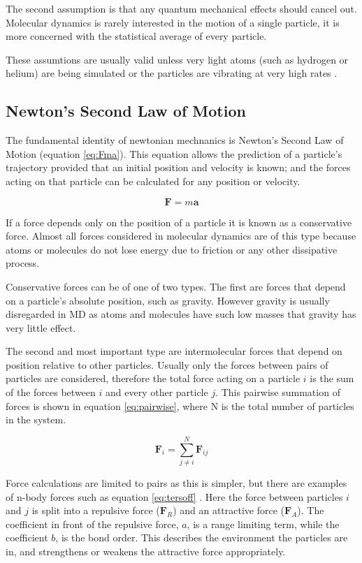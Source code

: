 \documentclass[12pt]{UoAthesis}
\begin{document}
The second assumption is that any quantum mechanical effects should
cancel out. Molecular dynamics is rarely interested in the motion of a
single particle, it is more concerned with the statistical average of
every particle.

These assumtions are usually valid unless very light atoms (such as
hydrogen or helium) are being simulated or the particles are vibrating
at very high rates \cite{Frenkel2002}.

\subsection{Newton's Second Law of Motion}

The fundamental identity of newtonian mechnanics is Newton's Second
Law of Motion (equation \eqref{eq:Fma}). This equation allows the prediction of a
particle's trajectory provided that an initial position and velocity
is known; and the forces acting on that particle can be calculated for
any position or velocity.

\begin{equation}
  \mathbf{F} = m\mathbf{a}
  \label{eq:Fma} 
\end{equation}

If a force depends only on the position of a particle it is known as a
conservative force. Almost all forces considered in molecular dynamics
are of this type because atoms or molecules do not lose energy due to
friction or any other dissipative process.

Conservative forces can be of one of two types.  The first are forces
that depend on a particle's absolute position, such as gravity.
However gravity is usually disregarded in MD as atoms and molecules
have such low masses that gravity has very little effect.

The second and most important type are intermolecular forces that
depend on position relative to other particles.  Usually only the
forces between pairs of particles are considered, therefore the total
force acting on a particle $i$ is the sum of the forces between $i$
and every other particle $j$.  This pairwise summation of forces is
shown in equation \eqref{eq:pairwise}, where N is the total number of
particles in the system.

\begin{equation} 
  \mathbf{F}_i = \sum_{j \not= i}^{N}\mathbf{F}_{ij}
  \label{eq:pairwise}
\end{equation}

Force calculations are limited to pairs as this is simpler, but there
are examples of n-body forces such as equation \eqref{eq:tersoff}
\cite{Tersoff1988}.  Here the force between particles $i$ and $j$ is
split into a repulsive force ($\mathbf{F}_R$) and an attractive force
($\mathbf{F}_A$).  The coefficient in front of the repulsive force,
$a$, is a range limiting term, while the coefficient $b$, is the bond
order.  This describes the environment the particles are in, and
strengthens or weakens the attractive force appropriately.
\end{document}
